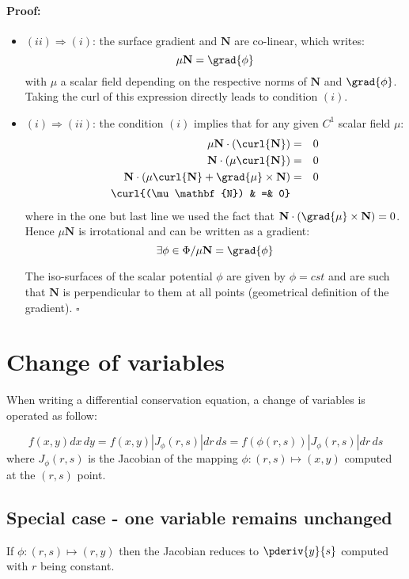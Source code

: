 \paragraph{Proof:}
\begin{itemize}
\item $(ii) \Rightarrow (i)$: the surface gradient and $\mathbf{N}$
are co-linear, which writes:
\[ \mu \mathbf{N} = \grad{\phi} \]
with $\mu$ a scalar field depending on the respective norms of 
$\mathbf{N}$ and $\grad{\phi}$.
Taking the curl of this expression directly leads to condition $(i)$.

\item $(i) \Rightarrow (ii)$: the condition $(i)$ implies that for any given 
$C^1$ scalar field $\mu$:
\begin{eqnarray*}
\mu \mathbf{N}\cdot(\curl{\mathbf{N}}) & = & 0 \\
\mathbf{N}\cdot(\mu\curl{\mathbf{N}}) & = & 0  \\
\mathbf{N}\cdot(\mu\curl{\mathbf{N}} + \grad{\mu} \times \mathbf{N} ) & = & 0 \\
\curl{(\mu \mathbf{N}) & =&  0}
\end{eqnarray*}
where in the one but last line we used the fact that 
$\mathbf{N} \cdot (\grad{\mu} \times \mathbf{N}) = 0$.
Hence $\mu \mathbf{N}$ is irrotational and can be written as a gradient:
\[ \exists \phi \in \Phi / \mu \mathbf{N} = \grad{\phi} \]

The iso-surfaces of the scalar potential $\phi$ are given by $\phi = cst$ 
and are such that $\mathbf{N}$ is perpendicular to them at all points
(geometrical definition of the gradient).
\hfill $\square$
\end{itemize}

\section*{Change of variables}
When writing a differential conservation equation, a change of variables
is operated as follow:

\[ f(x, y) dx\,dy= f(x, y)|J_\phi(r,s)|dr\, ds = f(\phi(r, s))|J_\phi(r,s)|dr\, ds \]
where $J_\phi (r,s)$ is the Jacobian of the mapping $\phi: (r, s) \mapsto (x, y) $
computed at the $(r, s)$ point.

\subsection*{Special case - one variable remains unchanged}
If $\phi: (r, s) \mapsto (r, y)$ then the Jacobian reduces to $\pderiv{y}{s}$ computed
with $r$ being constant.

